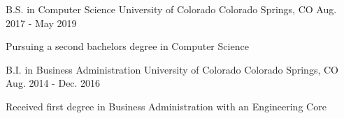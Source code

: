 

\begin{cventries}

  \cventry
    {B.S. in Computer Science} %
    {University of Colorado} %
    {Colorado Springs, CO} %
    {Aug. 2017 - May 2019} %
    {
      \begin{cvitems} %
        \item {Pursuing a second bachelors degree in Computer Science}
      \end{cvitems}
    }


  \cventry
    {B.I. in Business Administration} %
    {University of Colorado} %
    {Colorado Springs, CO} %
    {Aug. 2014 - Dec. 2016} %
    {
      \begin{cvitems} %
        \item {Received first degree in Business Administration with an Engineering Core}
      \end{cvitems}
    }
\end{cventries}
